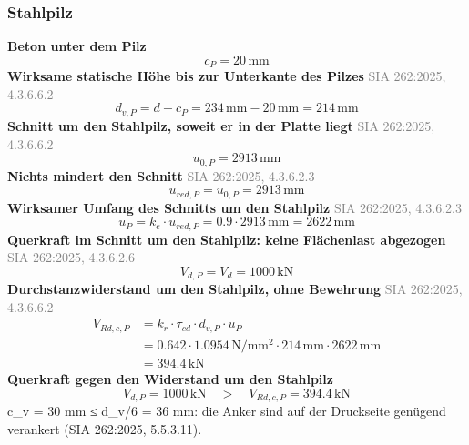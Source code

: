 \documentclass[11pt,a4paper]{article}
\newcommand{\normref}[1]{{\small\textcolor{gray}{#1}}}
\begin{document}
\subsubsection{Stahlpilz}
\noindent\textbf{Beton unter dem Pilz}
\begin{equation*}
c_P = 20\,\mathrm{mm}
\end{equation*}
\noindent\textbf{Wirksame statische Höhe bis zur Unterkante des Pilzes} \hfill \normref{SIA 262:2025, 4.3.6.6.2}
\begin{equation*}
d_{v,P} = d - c_P = 234\,\mathrm{mm} - 20\,\mathrm{mm} = 214\,\mathrm{mm}
\end{equation*}
\noindent\textbf{Schnitt um den Stahlpilz, soweit er in der Platte liegt} \hfill \normref{SIA 262:2025, 4.3.6.6.2}
\begin{equation*}
u_{0,P} = 2913\,\mathrm{mm}
\end{equation*}
\noindent\textbf{Nichts mindert den Schnitt} \hfill \normref{SIA 262:2025, 4.3.6.2.3}
\begin{equation*}
u_{red,P} = u_{0,P} = 2913\,\mathrm{mm}
\end{equation*}
\noindent\textbf{Wirksamer Umfang des Schnitts um den Stahlpilz} \hfill \normref{SIA 262:2025, 4.3.6.2.3}
\begin{equation*}
u_P = k_e \cdot u_{red,P} = 0.9 \cdot 2913\,\mathrm{mm} = 2622\,\mathrm{mm}
\end{equation*}
\noindent\textbf{Querkraft im Schnitt um den Stahlpilz: keine Flächenlast abgezogen} \hfill \normref{SIA 262:2025, 4.3.6.2.6}
\begin{equation*}
V_{d,P} = V_d = 1000\,\mathrm{kN}
\end{equation*}
\noindent\textbf{Durchstanzwiderstand um den Stahlpilz, ohne Bewehrung} \hfill \normref{SIA 262:2025, 4.3.6.6.2}
\begin{equation*}
\begin{aligned}
  V_{Rd,c,P} &= k_r \cdot \tau_{cd} \cdot d_{v,P} \cdot u_P \\
  &= 0.642 \cdot 1.0954\,\mathrm{N}/\mathrm{mm}^{2} \cdot 214\,\mathrm{mm} \cdot 2622\,\mathrm{mm} \\
  &= 394.4\,\mathrm{kN}
\end{aligned}
\end{equation*}
\noindent\textbf{Querkraft gegen den Widerstand um den Stahlpilz}
\begin{equation*}
V_{d,P} = 1000\,\mathrm{kN} \quad > \quad V_{Rd,c,P} = 394.4\,\mathrm{kN}
\end{equation*}
c\_v = 30 mm ≤ d\_v/6 = 36 mm: die Anker sind auf der Druckseite genügend verankert (SIA 262:2025, 5.5.3.11).
\end{document}
